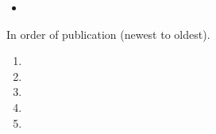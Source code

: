 \newpage
\begin{fullwidth}

  \begin{itemize}
  \item 
  \end{itemize}

  In order of publication (newest to oldest).

  \divider


  \begin{enumerate} \normalsize
  \item  \divider
  \item  \divider
  \item  \divider
  \item  \divider
  \item 
  \end{enumerate}

  \iffalse
  \divider

  \cvsubsection{In Submission}

  \begin{itemize} \normalsize
  \item  \divider
  \end{itemize}
  \fi
\end{fullwidth}

\iffalse
\cvsection{Volunteering}
I have been very active at the university outside of the studies. Below are some
things I have volunteered for among other things

\medskip



\divider



\divider


\fi



